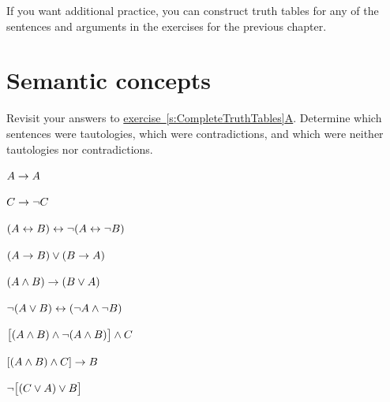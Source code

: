 If you want additional practice, you can construct truth tables for any of the sentences and arguments in the exercises for the previous chapter.



\chapter{Semantic concepts}\setcounter{ProbPart}{0}
\problempart
Revisit your answers to \hyperref[pr.TT.TTorC]{exercise~\ref*{s:CompleteTruthTables}A}. Determine which sentences were tautologies, which were contradictions, and which were neither tautologies nor contradictions.
\begin{compactlist}
\item $A \rightarrow A$ \hfill {}
\item $C \rightarrow\neg C$ \hfill {}
\item $(A \leftrightarrow B) \leftrightarrow \neg(A\leftrightarrow \neg B)$  \hfill {}
\item $(A \rightarrow B) \vee (B \rightarrow A)$  \hfill {}
\item $(A \wedge B) \rightarrow (B \vee A)$  \hfill {}
\item $\neg(A \vee B) \leftrightarrow (\neg A \wedge \neg B)$ \hfill {}
\item $\bigl[(A\wedge B) \wedge\neg(A\wedge B)\bigr] \wedge C$  \hfill {}
\item $[(A \wedge B) \wedge C] \rightarrow B$  \hfill {}
\item $\neg\bigl[(C\vee A) \vee B\bigr]$  \hfill {}
\end{compactlist}

\

